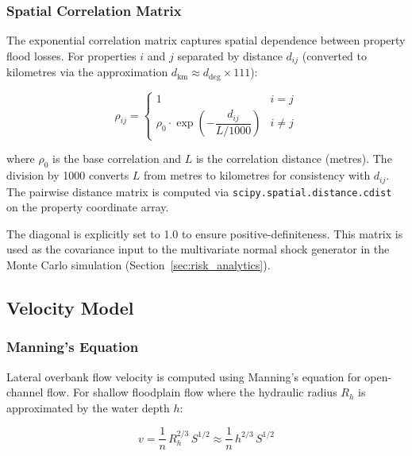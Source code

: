 \documentclass[11pt,a4paper]{article}
\begin{document}
\subsubsection{Spatial Correlation Matrix}

The exponential correlation matrix captures spatial dependence between property flood
losses. For properties $i$ and $j$ separated by distance $d_{ij}$ (converted to
kilometres via the approximation $d_{\text{km}} \approx d_{\text{deg}} \times 111$):

\begin{equation}
    \rho_{ij} = \begin{cases}
        1 & i = j \\[4pt]
        \rho_0 \cdot \exp\!\left(-\dfrac{d_{ij}}{L / 1000}\right) & i \neq j
    \end{cases}
    \label{eq:corr_matrix}
\end{equation}

\noindent where $\rho_0$ is the base correlation and $L$ is the correlation distance
(metres). The division by 1000 converts $L$ from metres to kilometres for consistency
with $d_{ij}$. The pairwise distance matrix is computed via
\texttt{scipy.spatial.distance.cdist} on the property coordinate array.

The diagonal is explicitly set to 1.0 to ensure positive-definiteness. This matrix is
used as the covariance input to the multivariate normal shock generator in the Monte
Carlo simulation (Section~\ref{sec:risk_analytics}).

\subsection{Velocity Model}
\label{sec:velocity}

\subsubsection{Manning's Equation}

Lateral overbank flow velocity is computed using Manning's equation for open-channel flow.
For shallow floodplain flow where the hydraulic radius $R_h$ is approximated by the water
depth $h$:

\begin{equation}
    v = \frac{1}{n} \, R_h^{2/3} \, S^{1/2} \approx \frac{1}{n} \, h^{2/3} \, S^{1/2}
    \label{eq:manning}
\end{equation}
\end{document}
